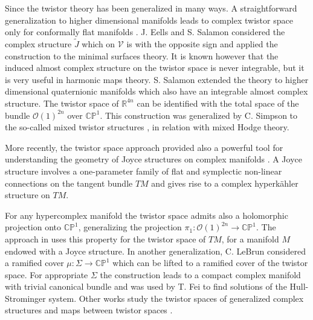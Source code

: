 \documentclass[11pt]{amsart}
\theoremstyle{definition}
\theoremstyle{plain}
\theoremstyle{definition}
\theoremstyle{plain}
\theoremstyle{remark}
\theoremstyle{plain}
\begin{document}
Since \cite{AHS} the twistor theory has been generalized in many ways. A straightforward generalization to higher dimensional manifolds leads to complex twistor space only for conformally flat manifolds \cite{Berard-B-Ochiai, O'Brian-Rawnsley}. J. Eells and S. Salamon  \cite{ES} considered the complex structure $\tilde{J}$ which on $\mathcal V$ is with the opposite sign and applied the construction to the minimal surfaces theory. It is known however that the induced almost complex structure on the twistor space is never integrable, but it is very useful in harmonic maps theory.  S. Salamon extended the theory to higher dimensional quaternionic manifolds  \cite{Salamon} which also have  an  integrable almost complex structure. The twistor space of ${\mathbb R}^{4n}$ can be identified with the total space of the bundle $\mathcal{O}(1)^{2n}$  over ${\mathbb {CP}}^1$. This construction  was generalized by C. Simpson to the so-called mixed twistor structures \cite{Simpson}, in relation with  mixed Hodge theory.

More recently, the  twistor space approach provided also a  powerful tool for understanding the  geometry of Joyce structures on complex manifolds \cite{Joyce, Bridgeland}. A Joyce structure involves a one-parameter family of flat and symplectic non-linear connections on the tangent
bundle $TM$  and gives rise to a  complex  hyperk\"ahler structure on $TM$. 



For any hypercomplex manifold the twistor space admits also a holomorphic projection onto ${\mathbb {CP}}^1$, generalizing the projection $\pi_1: \mathcal{O}(1)^{2n}\rightarrow  {\mathbb {CP}}^1$. The approach in \cite{Bridgeland} uses this property for the twistor space of $TM$, for a manifold $M$ endowed with a Joyce structure.  In another generalization,  C. LeBrun \cite{Lebrun} considered a ramified cover $\mu:\Sigma\rightarrow {\mathbb {CP}}^1$ which can be lifted to a ramified cover of the twistor space. For appropriate $\Sigma$ the construction leads to a compact complex manifold with trivial canonical bundle and was used by T. Fei \cite{Fei} to find solutions of the Hull-Strominger system.  Other works study  the twistor spaces of generalized complex structures \cite{DM, Deschamps} and maps between twistor spaces \cite{Davidov}.
\end{document}
